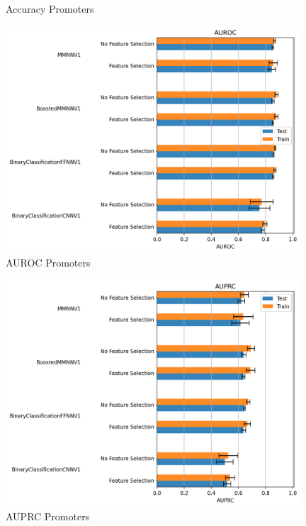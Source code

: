\documentclass{article}
\begin{document}
\begin{enumerate}
\begin{figure}[!ht]
        \caption{Accuracy Promoters}
        \label{fig:Accuracy_promoters}
    \end{figure}
    \begin{figure}[!ht]
        \centering
        \includegraphics[width=11cm]{image/barplots/promoters/AUROC_promoters.PNG}
        \caption{AUROC Promoters}
        \label{fig:AUROC_promoters}
    \end{figure}
    \begin{figure}[!ht]
        \centering
        \includegraphics[width=11cm]{image/barplots/promoters/AUPRC_promoters.PNG}
        \caption{AUPRC Promoters}
        \label{fig:AUPRC_promoters}
    \end{figure}
    

\end{enumerate}
\end{document}
